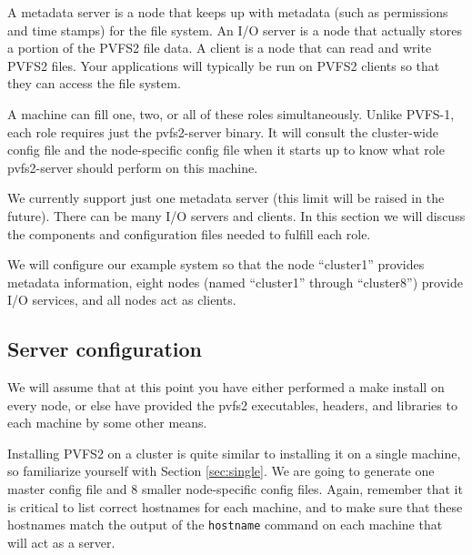 \documentclass[11pt, letterpaper]{article}
\begin{document}
A metadata server is a node that keeps up with metadata (such as permissions
and time stamps) for the file system. An I/O server is a node that actually
stores a portion of the PVFS2 file data. A client is a node that can read and
write PVFS2 files. Your applications will typically be run on PVFS2 clients so
that they can access the file system.

A machine can fill one, two, or all of these roles simultaneously. Unlike
PVFS-1, each role requires just the pvfs2-server binary.  It will consult the
cluster-wide config file and the node-specific config file when it starts up to
know what role pvfs2-server should perform on this machine.

We currently support just one metadata server (this limit will be raised in the
future).  There can be many I/O servers and clients. In this section we will
discuss the components and configuration files needed to fulfill each role.

We will configure our example system so that the node ``cluster1'' provides
metadata information, eight nodes (named ``cluster1'' through ``cluster8'')
provide I/O services, and all nodes act as clients.

\subsection{Server configuration}
We will assume that at this point you have either performed a make install 
on every node, or else have provided the pvfs2 executables, headers, and 
libraries to each machine by some other means.

Installing PVFS2 on a cluster is quite similar to installing it on a single
machine, so familiarize yourself with Section \ref{sec:single}.  We are going
to generate one master config file and 8 smaller node-specific config files. 
Again, remember that it is critical to list correct hostnames for each machine,
and to make sure that these hostnames match the output of the \texttt{hostname} 
command on each machine that will act as a server.
\end{document}
